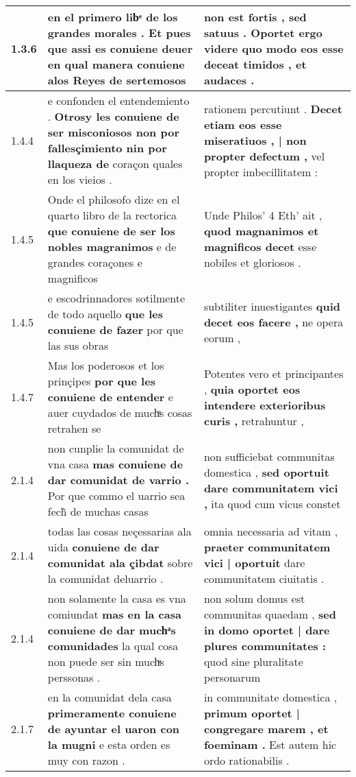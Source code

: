 \begin{tabular}{|p{1cm}|p{6.5cm}|p{6.5cm}|}
1.3.6 & en el primero libͤ de los grandes morales . \textbf{ Et pues que assi es conuiene deuer } en qual manera conuiene alos Reyes de sertemosos & non est fortis , sed satuus . \textbf{ Oportet ergo videre } quo modo eos esse deceat timidos , et audaces . \\\hline
1.4.4 & e confonden el entendemiento . \textbf{ Otrosy les conuiene de ser misconiosos non por fallesçimiento nin por llaqueza de } coraçon quales en los vieios . & rationem percutiunt . \textbf{ Decet etiam eos esse miseratiuos , | non propter defectum , } vel propter imbecillitatem : \\\hline
1.4.5 & Onde el philosofo dize en el quarto libro de la rectorica \textbf{ que conuiene de ser los nobles magranimos } e de grandes coraçones e magnificos & Unde Philos’ 4 Eth’ ait , \textbf{ quod magnanimos et magnificos decet } esse nobiles et gloriosos . \\\hline
1.4.5 & e escodrinnadores sotilmente de todo aquello \textbf{ que les conuiene de fazer } por que las sus obras & subtiliter inuestigantes \textbf{ quid decet eos facere , } ne opera eorum , \\\hline
1.4.7 & Mas los poderosos et los prinçipes \textbf{ por que les conuiene de entender } e auer cuydados de muchͣs cosas retrahen se & Potentes vero et principantes , \textbf{ quia oportet eos intendere exterioribus curis , } retrahuntur , \\\hline
2.1.4 & non cunplie la comunidat de vna casa \textbf{ mas conuiene de dar comunidat de varrio . } Por que commo el uarrio sea fech̃ de muchas casas & non sufficiebat communitas domestica , \textbf{ sed oportuit dare communitatem vici , } ita quod cum vicus constet \\\hline
2.1.4 & todas las cosas neçessarias ala uida \textbf{ conuiene de dar comunidat ala çibdat } sobre la comunidat deluarrio . & omnia necessaria ad vitam , \textbf{ praeter communitatem vici | oportuit } dare communitatem ciuitatis . \\\hline
2.1.4 & non solamente la casa es vna comiundat \textbf{ mas en la casa conuiene de dar muchͣs comunidades } la qual cosa non puede ser sin muchͣs perssonas . & non solum domus est communitas quaedam , \textbf{ sed in domo oportet | dare plures communitates : } quod sine pluralitate personarum \\\hline
2.1.7 & en la comunidat dela casa \textbf{ primeramente conuiene de ayuntar el uaron con la mugni } e esta orden es muy con razon . & in communitate domestica , \textbf{ primum oportet | congregare marem , et foeminam . } Est autem hic ordo rationabilis . \\\hline

\end{tabular}
